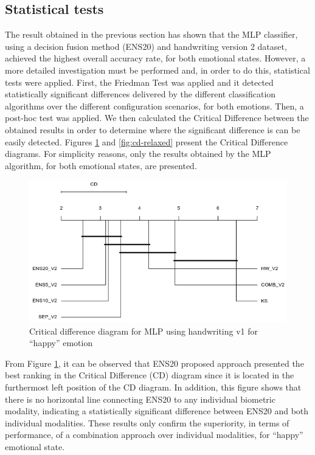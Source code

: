 \documentclass[conference]{IEEEtran}
\begin{document}
\subsection{Statistical tests}

The result obtained in the previous section has shown that the MLP classifier, using a decision fusion method (ENS20) and handwriting version 2 dataset, achieved the highest overall accuracy rate, for both emotional states. However, a more detailed investigation must be performed and, in order to do this, statistical tests were applied. 
First, the Friedman Test \cite{friedman} was applied and it detected statistically significant differences delivered by the different classification algorithms over the different configuration scenarios, for both emotions. Then, a post-hoc test was applied. We then calculated the Critical Difference between the obtained results in order to determine where the significant difference is can be easily detected. Figures \ref{fig:cd-happy} and \ref{fig:cd-relaxed} present the Critical Difference diagrams. For simplicity reasons, only the results obtained by the MLP algorithm, for both emotional states, are presented.

  

\begin{figure}[htbp]
  \centering
  \includegraphics[scale=0.5]{images/mlp_v2_happy.png}
  \caption{Critical difference diagram for MLP using handwriting v1 for ``happy'' emotion}
  \label{fig:cd-happy}
\end{figure}

From Figure \ref{fig:cd-happy}, it can be observed that ENS20 proposed approach presented the best ranking in the Critical Difference (CD) diagram since it is located in the furthermost left position of the CD diagram. In addition, this figure shows that there is no horizontal line connecting ENS20 to any individual biometric modality, indicating a statistically significant difference between ENS20 and both individual modalities. These results only confirm the superiority, in terms of performance, of a combination approach over individual modalities, for ``happy'' emotional state. 
\end{document}
